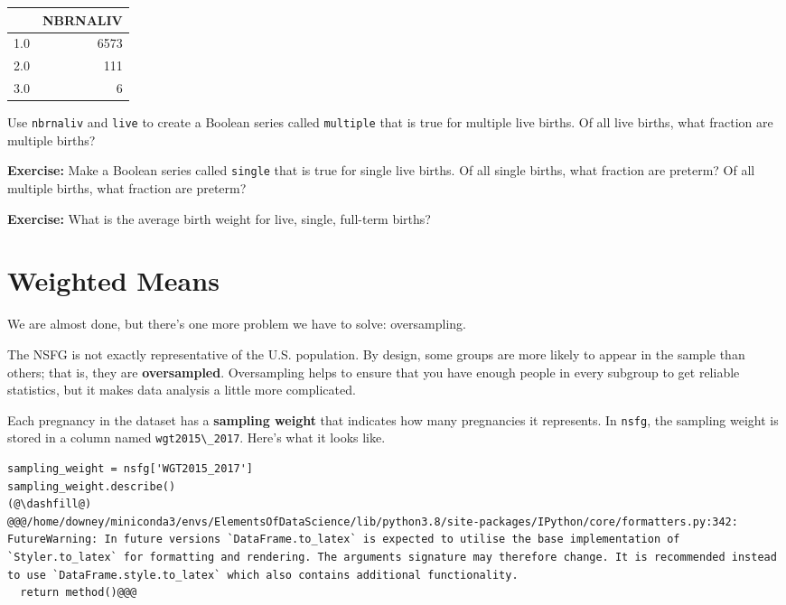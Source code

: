 \begin{tabular}{lr}
\midrule
{} &  NBRNALIV \\
\midrule
1.0 &      6573 \\
2.0 &       111 \\
3.0 &         6 \\
\midrule
\end{tabular}

Use \passthrough{\lstinline!nbrnaliv!} and
\passthrough{\lstinline!live!} to create a Boolean series called
\passthrough{\lstinline!multiple!} that is true for multiple live
births. Of all live births, what fraction are multiple births?

\textbf{Exercise:} Make a Boolean series called
\passthrough{\lstinline!single!} that is true for single live births. Of
all single births, what fraction are preterm? Of all multiple births,
what fraction are preterm?

\textbf{Exercise:} What is the average birth weight for live, single,
full-term births?

\hypertarget{weighted-means}{%
\section{Weighted Means}\label{weighted-means}}

We are almost done, but there's one more problem we have to solve:
oversampling.

The NSFG is not exactly representative of the U.S. population. By
design, some groups are more likely to appear in the sample than others;
that is, they are \textbf{oversampled}. Oversampling helps to ensure
that you have enough people in every subgroup to get reliable
statistics, but it makes data analysis a little more complicated.

Each pregnancy in the dataset has a \textbf{sampling weight} that
indicates how many pregnancies it represents. In
\passthrough{\lstinline!nsfg!}, the sampling weight is stored in a
column named \passthrough{\lstinline!wgt2015\_2017!}. Here's what it
looks like.

\begin{lstlisting}[]
sampling_weight = nsfg['WGT2015_2017']
sampling_weight.describe()
(@\dashfill@)
@@@/home/downey/miniconda3/envs/ElementsOfDataScience/lib/python3.8/site-packages/IPython/core/formatters.py:342: FutureWarning: In future versions `DataFrame.to_latex` is expected to utilise the base implementation of `Styler.to_latex` for formatting and rendering. The arguments signature may therefore change. It is recommended instead to use `DataFrame.style.to_latex` which also contains additional functionality.
  return method()@@@
\end{lstlisting}


